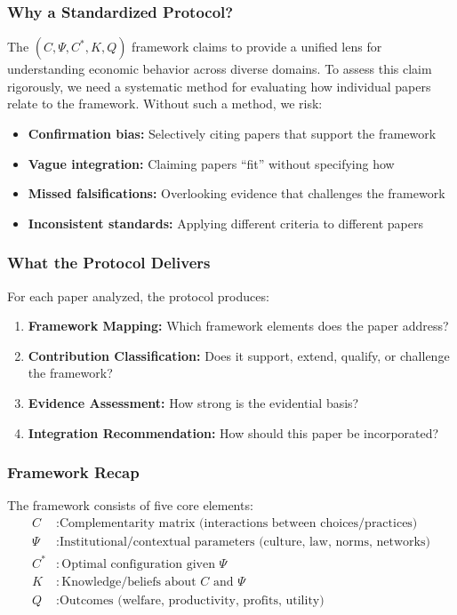 \documentclass[12pt,a4paper]{article}
\begin{document}
\subsubsection{Why a Standardized Protocol?}

The $(C, \Psi, C^*, K, Q)$ framework claims to provide a unified lens for understanding 
economic behavior across diverse domains. To assess this claim rigorously, we need a 
systematic method for evaluating how individual papers relate to the framework. Without
such a method, we risk:

\begin{itemize}
  \item \textbf{Confirmation bias:} Selectively citing papers that support the framework
  \item \textbf{Vague integration:} Claiming papers ``fit'' without specifying how
  \item \textbf{Missed falsifications:} Overlooking evidence that challenges the framework
  \item \textbf{Inconsistent standards:} Applying different criteria to different papers
\end{itemize}

\subsubsection{What the Protocol Delivers}

For each paper analyzed, the protocol produces:
\begin{enumerate}
  \item \textbf{Framework Mapping:} Which framework elements does the paper address?
  \item \textbf{Contribution Classification:} Does it support, extend, qualify, or challenge the framework?
  \item \textbf{Evidence Assessment:} How strong is the evidential basis?
  \item \textbf{Integration Recommendation:} How should this paper be incorporated?
\end{enumerate}

\subsubsection{Framework Recap}

The framework consists of five core elements:
\begin{align}
  C &: \text{Complementarity matrix (interactions between choices/practices)} \\
  \Psi &: \text{Institutional/contextual parameters (culture, law, norms, networks)} \\
  C^* &: \text{Optimal configuration given } \Psi \\
  K &: \text{Knowledge/beliefs about } C \text{ and } \Psi \\
  Q &: \text{Outcomes (welfare, productivity, profits, utility)}
\end{align}
\end{document}
